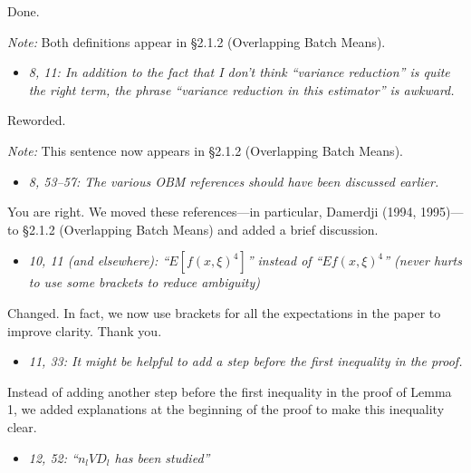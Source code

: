 \documentclass[11pt,notitlepage,onecolumn]{article}
\newcommand{\noi}{\noindent}
\begin{document}
\noi
Done. 
\smallskip  

\noi 
{\it Note:} Both definitions appear in \S 2.1.2 (Overlapping Batch Means).
\medskip 



\begin{itemize}
\item[] \textit{8, 11: In addition to the fact that I don't think ``variance reduction'' is quite the right term, the phrase ``variance reduction in this estimator'' is awkward.}
\end{itemize}

\noi
Reworded.\smallskip 

\noi 
{\it Note:} This sentence now appears in \S 2.1.2 (Overlapping Batch Means). 
\medskip 



\begin{itemize}
\item[] \textit{8, 53--57: The various OBM references should have been discussed earlier.}
\end{itemize}

\noi
You are right. 
We moved these references---in particular, Damerdji (1994, 1995)---to \S 2.1.2 (Overlapping Batch Means) and added a brief discussion.  
\medskip 



\begin{itemize}
\item[] \textit{10, 11 (and elsewhere): ``$E[f(x, \xi)^4]$'' instead of ``$Ef(x, \xi)^4$'' (never hurts to use some brackets to reduce ambiguity)}
\end{itemize}

\noi
Changed.
In fact, we now use brackets for all the expectations in the paper to improve clarity. 
Thank you.
\medskip 



\begin{itemize}
\item[] \textit{11, 33: It might be helpful to add a step before the first inequality in the proof.}
\end{itemize}

\noi
Instead of adding another step before the first inequality in the proof of Lemma 1, we added explanations at the beginning of the proof to make this inequality clear.   
\medskip 



\begin{itemize}
\item[] \textit{12, 52: ``$n_l VD_l$ has been studied''}
\end{itemize}
\end{document}
